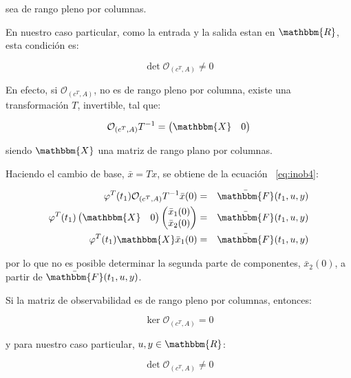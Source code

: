 	sea de rango pleno por columnas.

	En nuestro caso particular, como la entrada y la salida estan en $\mathbbm{R}$, esta condición es:

	\begin{equation*}
		\det{\mathcal{O}_{(c^T, A)}} \ne 0
	\end{equation*}

	En efecto, si $\mathcal{O}_{(c^T, A)}$, no es de rango pleno por columna, existe una transformación $T$, invertible, tal que:

	\begin{equation*}
		\mathcal{O}_{(c^T, A)} T^{-1} =
		\begin{pmatrix}
			\mathbbm{X} & 0 
		\end{pmatrix}
	\end{equation*}

	siendo $\mathbbm{X}$ una matriz de rango plano por columnas.

	Haciendo el cambio de base, $\bar{x} = T x$, se obtiene de la ecuación ~\ref{eq:inob4}:

	\begin{eqnarray*}
		\varphi^T(t_1) \mathcal{O}_{(c^T, A)} T^{-1} \bar{x}(0) & = & \bar{\mathbbm{F}}(t_1, u, y) \\
		\varphi^T(t_1)
		\begin{pmatrix}
		 	\mathbbm{X} & 0
		\end{pmatrix}
		\begin{pmatrix}
		 	\bar{x}_1(0) \\
		 	\bar{x}_2(0)
		\end{pmatrix} & = & \bar{\mathbbm{F}}(t_1, u, y) \\
		\varphi^T(t_1) \mathbbm{X} \bar{x}_1(0) & = & \bar{\mathbbm{F}}(t_1, u, y)
	\end{eqnarray*}

	por lo que no es posible determinar la segunda parte de componentes, $\bar{x}_2(0)$, a partir de $\bar{\mathbbm{F}}(t_1, u, y)$.

	Si la matriz de observabilidad es de rango pleno por columnas, entonces:

	\begin{equation*}
		\ker{\mathcal{O}_{(c^T, A)}} = {0}
	\end{equation*}

	y para nuestro caso particular, $u, y \in \mathbbm{R}$:

	\begin{equation*}
		\det{\mathcal{O}_{(c^T, A)}} \ne 0
	\end{equation*}

